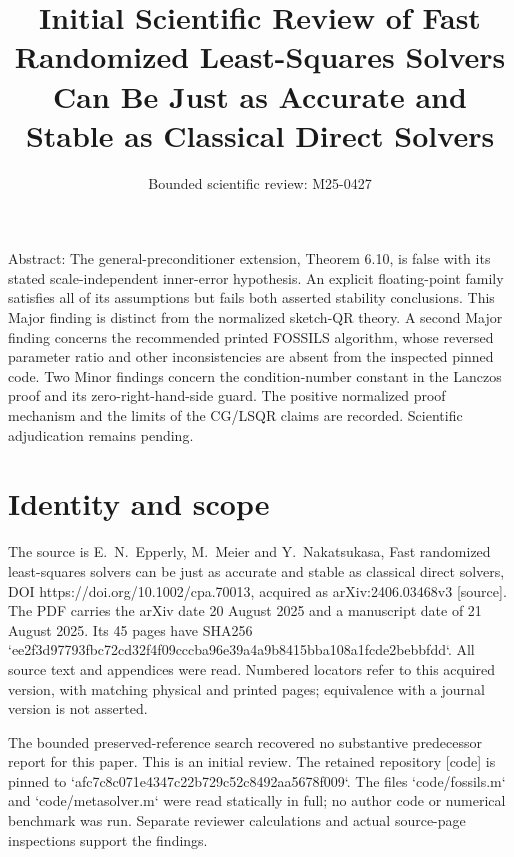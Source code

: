\documentclass[10pt]{article}
\title{Initial Scientific Review of
Fast Randomized Least-Squares Solvers Can Be
Just as Accurate and Stable as Classical Direct Solvers}
\author{Bounded scientific review: M25-0427}
\date{}
\begin{document}
\maketitle
Abstract: The general-preconditioner extension, Theorem 6.10, is false with its stated scale-independent inner-error hypothesis. An explicit floating-point family satisfies all of its assumptions but fails both asserted stability conclusions. This Major finding is distinct from the normalized sketch-QR theory. A second Major finding concerns the recommended printed FOSSILS algorithm, whose reversed parameter ratio and other inconsistencies are absent from the inspected pinned code. Two Minor findings concern the condition-number constant in the Lanczos proof and its zero-right-hand-side guard. The positive normalized proof mechanism and the limits of the CG/LSQR claims are recorded. Scientific adjudication remains pending.\par
\section*{Identity and scope}
The source is E. N. Epperly, M. Meier and Y. Nakatsukasa, Fast randomized least-squares solvers can be just as accurate and stable as classical direct solvers, DOI https://doi.org/10.1002/cpa.70013, acquired as arXiv:2406.03468v3 [source]. The PDF carries the arXiv date 20 August 2025 and a manuscript date of 21 August 2025. Its 45 pages have SHA256 `ee2f3d97793fbc72cd32f4f09cccba96e39a4a9b8415bba108a1fcde2bebbfdd`. All source text and appendices were read. Numbered locators refer to this acquired version, with matching physical and printed pages; equivalence with a journal version is not asserted.\par
The bounded preserved-reference search recovered no substantive predecessor report for this paper. This is an initial review. The retained repository [code] is pinned to `afc7c8c071e4347c22b729c52c8492aa5678f009`. The files `code/fossils.m` and `code/metasolver.m` were read statically in full; no author code or numerical benchmark was run. Separate reviewer calculations and actual source-page inspections support the findings.\par
\end{document}
